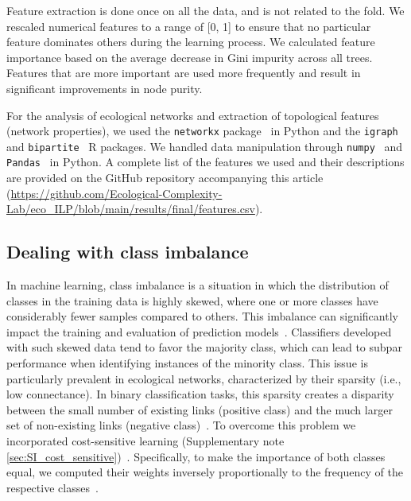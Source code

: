 \documentclass[oneside, a4paper, onecolumn, 11pt]{article}
\begin{document}
\begin{refsection}
Feature extraction is done once on all the data, and is not related to the fold. We rescaled numerical features to a range of [0, 1] to ensure that no particular feature dominates others during the learning process. We calculated feature importance based on the average decrease in Gini impurity across all trees. Features that are more important are used more frequently and result in significant improvements in node purity.

For the analysis of ecological networks and extraction of topological features (network properties), we used the \verb|networkx| package~\autocite{Hagberg2008-wn} in Python and the \verb|igraph|~\autocite{Csardi2006-kz} and \verb|bipartite|~\autocite{Dormann2009-qq} R packages. We handled data manipulation through \verb|numpy|~\autocite{Harris2020-fd} and \verb|Pandas|~\autocite{Team2020-ww, McKinney2010-ps} in Python. A complete list of the features we used and their descriptions are provided on the GitHub repository accompanying this article (\url{https://github.com/Ecological-Complexity-Lab/eco_ILP/blob/main/results/final/features.csv}).

\subsection*{Dealing with class imbalance} \label{sec:imbalance}

In machine learning, class imbalance is a situation in which the distribution of classes in the training data is highly skewed, where one or more classes have considerably fewer samples compared to others. This imbalance can significantly impact the training and evaluation of prediction models~\autocite{Poisot2023-di}. Classifiers developed with such skewed data tend to favor the majority class, which can lead to subpar performance when identifying instances of the minority class. This issue is particularly prevalent in ecological networks, characterized by their sparsity (i.e., low connectance). In binary classification tasks, this sparsity creates a disparity between the small number of existing links (positive class) and the much larger set of non-existing links (negative class)~\autocite{Strydom2021-aq,Poisot2023-di}. To overcome this problem we incorporated cost-sensitive learning (Supplementary note \ref{sec:SI_cost_sensitive})~\autocite{Pedregosa2011-bw}. Specifically, to make the importance of both classes equal, we computed their weights inversely proportionally to the frequency of the respective classes~\autocite{Thai-Nghe2010-xl,Yang2015-ox}.


\end{refsection}
\end{document}
